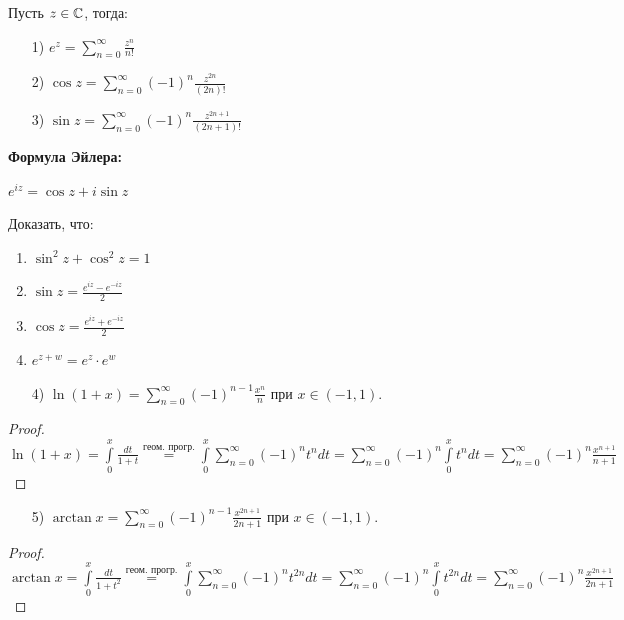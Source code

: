 \begin{definition}
    Пусть $z\in \mathbb{C}$, тогда: 
    
    \begin{enumerate}
        \item[1)] $e^z=\sum\limits_{n=0}^\infty\frac{z^n}{n!}$
        \item[2)] $\cos z=\sum\limits_{n=0}^\infty(-1)^n\frac{z^{2n}}{(2n)!}$
        \item[3)] $\sin z=\sum\limits_{n=0}^\infty(-1)^n\frac{z^{2n+1}}{(2n+1)!}$
    \end{enumerate}
\end{definition}

\textbf{Формула Эйлера:}

$e^{iz}=\cos z+i\sin z$

\begin{exercise}
    Доказать, что:
\begin{enumerate}
    \item $\sin^2z+\cos^2z=1$
    \item $\sin z=\frac{e^{iz}-e^{-iz}}{2}$
    \item $\cos z=\frac{e^{iz}+e^{-iz}}{2}$
    \item $e^{z+w}=e^z\cdot e^w$
\end{enumerate}
\end{exercise}



\begin{enumerate}
    \item[4)] $\ln(1+x)=\sum\limits_{n=0}^\infty (-1)^{n-1}\frac{x^n}{n}$ при $x\in (-1, 1)$.
\end{enumerate}

\begin{proof} 
    $\ln (1+x) =\int\limits_0^x\frac{dt}{1+t}\overset{\text{геом. прогр.}}{=}\int\limits_0^x \sum\limits_{n=0}^\infty(-1)^nt^ndt = \sum\limits_{n=0}^\infty(-1)^n \int\limits_0^x t^ndt = \sum\limits_{n=0}^\infty (-1)^n\frac{x^{n+1}}{n+1}$
\end{proof}

\begin{enumerate}
    \item[5)] $\arctan x=\sum\limits_{n=0}^\infty (-1)^{n-1}\frac{x^{2n+1}}{2n+1}$ при $x\in (-1, 1)$.
\end{enumerate}

\begin{proof}
    $\arctan x =\int\limits_0^x\frac{dt}{1+t^2}\overset{\text{геом. прогр.}}{=}\int\limits_0^x \sum\limits_{n=0}^\infty(-1)^nt^{2n}dt = \sum\limits_{n=0}^\infty(-1)^n \int\limits_0^x t^{2n}dt = \sum\limits_{n=0}^\infty (-1)^n\frac{x^{2n+1}}{2n+1}$
\end{proof}

